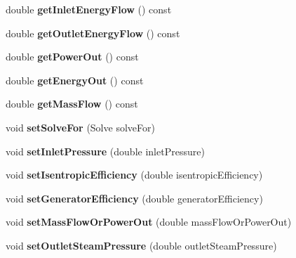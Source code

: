 \begin{DoxyCompactItemize}
\item 
\mbox{\label{class_turbine_ae5d55a7b882e4780d490d43409f8f06c}} 
double {\bfseries get\+Inlet\+Energy\+Flow} () const
\item 
\mbox{\label{class_turbine_aa20c0f9dd81cd9bfd5eda77f588516b5}} 
double {\bfseries get\+Outlet\+Energy\+Flow} () const
\item 
\mbox{\label{class_turbine_a89585cc2fbfdbe67d539eae08c369fa2}} 
double {\bfseries get\+Power\+Out} () const
\item 
\mbox{\label{class_turbine_a143fc660274e0d65ccb8fc55cc2caf83}} 
double {\bfseries get\+Energy\+Out} () const
\item 
\mbox{\label{class_turbine_a4893a203dbbf9db9ca77a0b278c4c118}} 
double {\bfseries get\+Mass\+Flow} () const
\item 
\mbox{\label{class_turbine_a96f54a8fc572dae6c5298289de890f4d}} 
void {\bfseries set\+Solve\+For} (Solve solve\+For)
\item 
\mbox{\label{class_turbine_a04996baab9a40d449a69c737c00be8e4}} 
void {\bfseries set\+Inlet\+Pressure} (double inlet\+Pressure)
\item 
\mbox{\label{class_turbine_ae67daa481ef48bcf8aef84bcccb4611d}} 
void {\bfseries set\+Isentropic\+Efficiency} (double isentropic\+Efficiency)
\item 
\mbox{\label{class_turbine_a51e9c5050a5be51b86dc23e690bd3f40}} 
void {\bfseries set\+Generator\+Efficiency} (double generator\+Efficiency)
\item 
\mbox{\label{class_turbine_a73522631e2eeefa8ea14d5b537e3e760}} 
void {\bfseries set\+Mass\+Flow\+Or\+Power\+Out} (double mass\+Flow\+Or\+Power\+Out)
\item 
\mbox{\label{class_turbine_ab9612657de02e4523492b687917b4091}} 
void {\bfseries set\+Outlet\+Steam\+Pressure} (double outlet\+Steam\+Pressure)
\item 

\end{DoxyCompactItemize}
